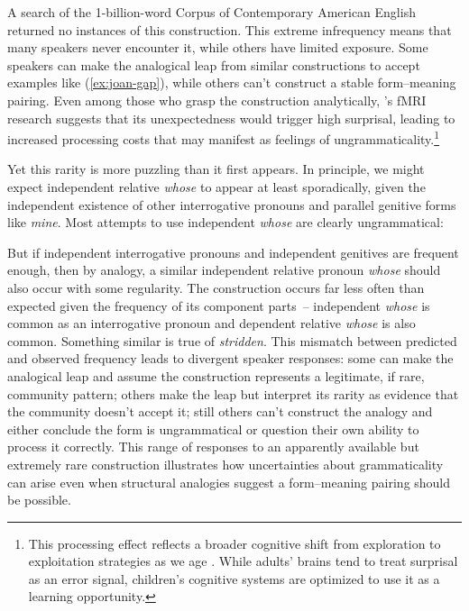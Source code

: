 \z

A search of the 1-billion-word Corpus of Contemporary American English returned no instances of this construction. This extreme infrequency means that many speakers never encounter it, while others have limited exposure. Some speakers can make the analogical leap from similar constructions to accept examples like (\ref{ex:joan-gap}), while others can't construct a stable form--meaning pairing. Even among those who grasp the construction analytically, \textcite{shain2020fmri}'s fMRI research suggests that its unexpectedness would trigger high surprisal, leading to increased processing costs that may manifest as feelings of ungrammaticality.\footnote{This processing effect reflects a broader cognitive shift from exploration to exploitation strategies as we age \autocite{gopnik2017}. While adults' brains tend to treat surprisal as an error signal, children's cognitive systems are optimized to use it as a learning opportunity.}

Yet this rarity is more puzzling than it first appears. In principle, we might expect independent relative \textit{whose} to appear at least sporadically, given the independent existence of other interrogative pronouns and parallel genitive forms like \textit{mine}. Most attempts to use independent \textit{whose} are clearly ungrammatical:

\ea
   \z
\z

But if independent interrogative pronouns and independent genitives are frequent enough, then by analogy, a similar independent relative pronoun \textit{whose} should also occur with some regularity. The construction occurs far less often than expected given the frequency of its component parts~-- independent \textit{whose} is common as an interrogative pronoun and dependent relative \textit{whose} is also common. Something similar is true of \textit{stridden}. This mismatch between predicted and observed frequency leads to divergent speaker responses: some can make the analogical leap and assume the construction represents a legitimate, if rare, community pattern; others make the leap but interpret its rarity as evidence that the community doesn't accept it; still others can't construct the analogy and either conclude the form is ungrammatical or question their own ability to process it correctly. This range of responses to an apparently available but extremely rare construction illustrates how uncertainties about grammaticality can arise even when structural analogies suggest a form--meaning pairing should be possible.

